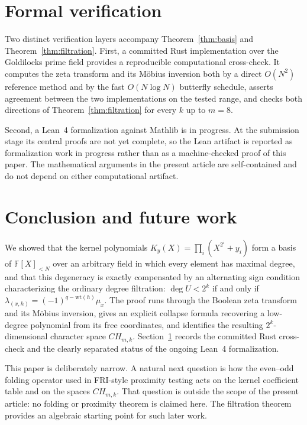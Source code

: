 \documentclass[preprint,3p,12pt,numbers]{elsarticle}
\theoremstyle{definition}
\theoremstyle{remark}
\newcommand{\wt}{\mathrm{wt}}
\begin{document}
\section{Formal verification}
\label{sec:verification}

Two distinct verification layers accompany
Theorem~\ref{thm:basis} and Theorem~\ref{thm:filtration}. First, a
committed Rust implementation over the Goldilocks prime field provides a
reproducible computational cross-check. It computes the zeta transform
and its M\"obius inversion both by a direct $O(N^2)$ reference method and
by the fast $O(N\log N)$ butterfly schedule, asserts agreement between
the two implementations on the tested range, and checks both directions
of Theorem~\ref{thm:filtration} for every $k$ up to $m=8$.

Second, a Lean~4 formalization against Mathlib is in progress. At the
submission stage its central proofs are not yet complete, so the Lean
artifact is reported as formalization work in progress rather than as a
machine-checked proof of this paper. The mathematical arguments in the
present article are self-contained and do not depend on either
computational artifact.

\section{Conclusion and future work}
\label{sec:conclusion}

We showed that the kernel polynomials $K_y(X) = \prod_i (X^{2^i}+y_i)$
form a basis of $\mathbb{F}[X]_{<N}$ over an arbitrary field in which
every element has maximal degree, and that this degeneracy is exactly
compensated by an alternating sign condition characterizing the ordinary
degree filtration: $\deg U < 2^k$ if and only if
$\lambda_{(x,h)} = (-1)^{q-\wt(h)}\mu_x$. The proof runs through the
Boolean zeta transform and its M\"obius inversion, gives an explicit
collapse formula recovering a low-degree polynomial from its free
coordinates, and identifies the resulting $2^k$-dimensional character
space $CH_{m,k}$. Section~\ref{sec:verification} records the committed Rust cross-check and the clearly separated status of the ongoing Lean~4 formalization.

This paper is deliberately narrow. A natural next question is how the
even--odd folding operator used in FRI-style proximity testing acts on
the kernel coefficient table and on the spaces $CH_{m,k}$. That question
is outside the scope of the present article: no folding or proximity
theorem is claimed here. The filtration theorem provides an algebraic
starting point for such later work.
\end{document}
